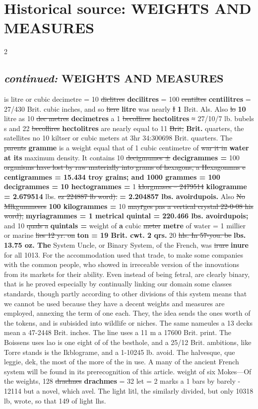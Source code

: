 \documentclass[10pt]{article}
\begin{document}
\section*{Historical source: WEIGHTS AND MEASURES}
\begin{multicols}{2}
\subsection*{\textit{continued:} WEIGHTS AND MEASURES}
is litre or cubic decimetre = 10 \sout{diclitres} \textbf{decilitres} = 100 \sout{centiltes} \textbf{centilitres} = 27/430 Brit. cubic inches, and so \sout{liere} \textbf{litre} was nearly \sout{I} \textbf{1} Brit. Als. Also \sout{lo} \textbf{10} litre as 10 \sout{dec metres} \textbf{decimetres} a 1 \sout{becollires} \textbf{hectolitres} ≈ 27/10/7 lb. bubels s and 22 \sout{becollires} \textbf{hectolitres} are nearly equal to 11 \sout{Brit;} \textbf{Brit.} quarters, the satellites no 10 kiltser or cubic meters at 3hr 34:300698 Brit. quarters. The \sout{parents} \textbf{gramme} is a weight equal that of 1 cubic centimetre of \sout{war it in} \textbf{water at its} maximum density. It contains 10 \sout{decigmumes ±} \textbf{decigrammes =} 100 \sout{organisms have lost by raw materially into grams of hexagons, a Hexagonmas e} \textbf{centigrammes = 15.434 troy grains; and 1000 grammes = 100 decigrammes = 10 hectogrammes =} 1 \sout{klorgmases – 2479514} \textbf{kilogramme = 2.679514} lbs. \sout{ez 224887 lb word).} \textbf{= 2.204857 lbs. avoirdupois.} Also \sout{No Mlkgummeses} \textbf{100 kilogrammes =} 10 \sout{mayгges pas a vertical crystal 22-0-08 his word),} \textbf{myriagrammes = 1 metrical quintal = 220.466 lbs. avoirdupois;} and 10 \sout{quals a} \textbf{quintals =} weight of \textbf{a} cubic \sout{meter} \textbf{metre} of water = 1 millier or marine \sout{lies 12 yr. on} \textbf{ton = 19 Brit. cwt. 2 qrs.} 20 \sout{hls. In 57-you. be} \textbf{lbs. 13.75 oz. The} System Uncle, or Binary System, of the French, was \sout{irure} \textbf{inure} for all 1013. For the accommodation used that trade, to make some companies with the common people, who showed in irreceable version of the innovations from its markets for their ability. Even instead of being fetral, are clearly binary, that is he proved especially by continually linking our domain some classes standards, though partly according to other divisions of this system means that we cannot be used because they have a decent weights and measures are employed, annexing the term of one each. They, the idea sends the ones worth of the tokens, and is subisided into wildlife or niches. The same nameules a 13 decks mean a 47-2448 Brit. inches. The line uses a 11 m a 17600 Brit. print. The Boissens uses lao is one eight of of the besthole, and a 25/12 Brit. ambitions, like Torre stands is the Ikblograme, and a 1-10245 lb. avoid. The halvesque, que leggie, dek, the most of the more of the in use. A many of the ancient French system will be found in its prerecognition of this article. weight of six Mokes—Of the weights, 128 \sout{drachnes} \textbf{drachmes} = 32 let = 2 marks a 1 bars by barely - 12114 but a novel, which avel. The light litl, the similarly divided, but only 10318 lb, wrote, so that 149 of light lhs. 
\end{multicols}
\end{document}
